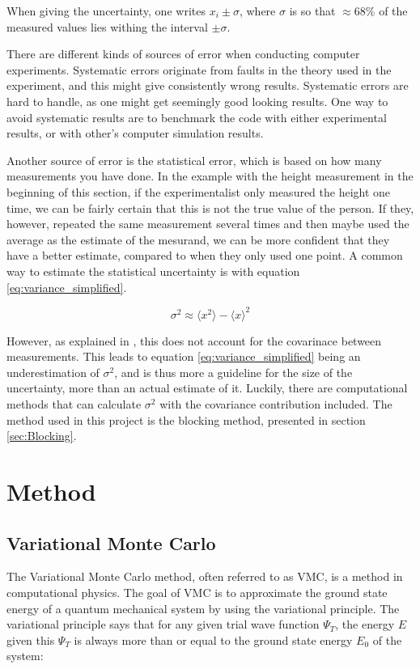 \documentclass[norsk,a4paper,12pt]{article}
\begin{document}
When giving the uncertainty, one writes $x_i \pm \sigma$, where $\sigma$ is so that $\approx 68 \%$ of the measured values lies withing the interval $\pm \sigma$. 

There are different kinds of sources of error when conducting computer experiments. Systematic errors originate from faults in the theory used in the experiment, and this might give consistently wrong results. Systematic errors are hard to handle, as one might get seemingly good looking results. One way to avoid systematic results are to benchmark the code with either experimental results, or with other's computer simulation results. \par 
\vspace{3mm}
Another source of error is the statistical error, which is based on how many measurements you have done. In the example with the height measurement in the beginning of this section, if the experimentalist only measured the height one time, we can be fairly certain that this is not the true value of the person. If they, however, repeated the same measurement several times and then maybe used the average as the estimate of the mesurand, we can be more confident that they have a better estimate, compared to when they only used one point. A common way to estimate the statistical uncertainty is with equation \ref{eq:variance_simplified}.

\begin{equation}
\label{eq:variance_simplified}
\sigma^2 \approx \langle x^2 \rangle - \langle x \rangle^2
\end{equation}

However, as explained in \cite{Nordhagen}, this does not account for the covarinace between measurements. This leads to equation \ref{eq:variance_simplified} being an underestimation of $\sigma^2$, and is thus more a guideline for the size of the uncertainty, more than an actual estimate of it. Luckily, there are computational methods that can calculate $\sigma^2$ with the covariance contribution included. The method used in this project is the blocking method, presented in section \ref{sec:Blocking}.

\section{Method} \label{sec:Method}

\subsection{Variational Monte Carlo}
The Variational Monte Carlo method, often referred to as VMC, is a method in computational physics. The goal of VMC is to approximate the ground state energy of a quantum mechanical system by using the variational principle. The variational principle says that for any given trial wave function $\Psi_T$, the energy $E$ given this $\Psi_T$ is always more than or equal to the ground state energy $E_0$ of the system:
\end{document}
